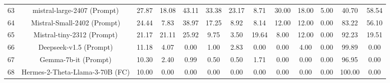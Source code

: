 \documentclass{article}
\begin{document}
\begin{table}[h]
{\begin{tabular}{ccccccccccccc}
63                     & mistral-large-2407 (Prompt)                    & 27.87                         & 18.08  & 43.11    & 33.38    & 23.17                                                       & 8.71   & 30.00    & 18.00    & 5.00                                                        & 40.70                         & 58.54                       \\
64                     & Mistral-Small-2402 (Prompt)                    & 24.44                         & 7.83   & 38.97    & 17.25    & 8.92                                                        & 8.14   & 12.00    & 12.00    & 0.00                                                        & 83.22                         & 56.10                       \\
65                     & Mistral-tiny-2312 (Prompt)                     & 21.17                         & 21.11  & 25.92    & 9.75     & 3.50                                                        & 19.64  & 8.00     & 12.00    & 0.00                                                        & 92.23                         & 19.51                       \\
66                     & Deepseek-v1.5 (Prompt)                         & 11.18                         & 4.07   & 0.00     & 1.00     & 2.83                                                        & 0.00   & 0.00     & 4.00     & 0.00                                                        & 99.89                         & 0.00                        \\
67                     & Gemma-7b-it (Prompt)                           & 10.30                         & 2.40   & 0.99     & 0.50     & 0.50                                                        & 1.71   & 0.00     & 0.00     & 0.00                                                        & 96.95                         & 0.00                        \\
68                     & Hermes-2-Theta-Llama-3-70B (FC)                & 10.00                         & 0.00   & 0.00     & 0.00     & 0.00                                                        & 0.00   & 0.00     & 0.00     & 0.00                                                        & 100.00                        & 0.00                        \\ \bottomrule
\end{tabular}
}
\end{table}
\end{document}
